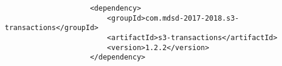 \documentclass[a4paper,twoside]{article}
\begin{document}
			\begin{small}
				\begin{verbatim}
					<dependency>
						<groupId>com.mdsd-2017-2018.s3-transactions</groupId>
						<artifactId>s3-transactions</artifactId>
						<version>1.2.2</version>
					</dependency>
				\end{verbatim}
			\end{small}
 
\vfill

{\small
	}

\listoftables

\listoffigures
\end{document}
